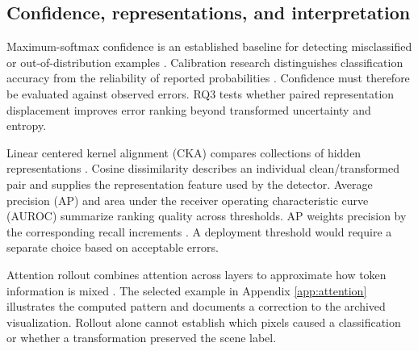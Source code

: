 \subsection{Confidence, representations, and interpretation}

Maximum-softmax confidence is an established baseline for detecting misclassified or out-of-distribution examples \cite{baseline}. Calibration research distinguishes classification accuracy from the reliability of reported probabilities \cite{calibration}. Confidence must therefore be evaluated against observed errors. RQ3 tests whether paired representation displacement improves error ranking beyond transformed uncertainty and entropy.

Linear centered kernel alignment (CKA) compares collections of hidden representations \cite{cka}. Cosine dissimilarity describes an individual clean/transformed pair and supplies the representation feature used by the detector. Average precision (AP) and area under the receiver operating characteristic curve (AUROC) summarize ranking quality across thresholds. AP weights precision by the corresponding recall increments \cite{ap}. A deployment threshold would require a separate choice based on acceptable errors.

Attention rollout combines attention across layers to approximate how token information is mixed \cite{rollout}. The selected example in Appendix \ref{app:attention} illustrates the computed pattern and documents a correction to the archived visualization. Rollout alone cannot establish which pixels caused a classification or whether a transformation preserved the scene label.
